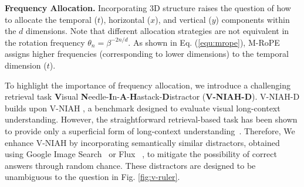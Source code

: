 

\noindent \textbf{Frequency Allocation.}
Incorporating 3D structure raises the question of how to allocate the temporal ($t$), horizontal ($x$), and vertical ($y$) components within the $d$ dimensions.
Note that different allocation strategies are not equivalent in the rotation frequency $\theta_{n} = \beta^{-2n/d}$.
As shown in Eq. (\ref{equ:mrope}), M-RoPE assigns higher frequencies (corresponding to lower dimensions) to the temporal dimension ($t$).

To highlight the importance of frequency allocation, we introduce a challenging retrieval task \textbf{V}isual \textbf{N}eedle-\textbf{I}n-\textbf{A}-\textbf{H}astack-\textbf{D}istractor (\textbf{V-NIAH-D}).
V-NIAH-D builds upon V-NIAH \cite{zhang2024longva}, a benchmark designed to evaluate visual long-context understanding.
However, the straightforward retrieval-based task has been shown to provide only a superficial form of long-context understanding~\cite{hsieh2024ruler,yuan2024lv}.
Therefore, We enhance V-NIAH by incorporating semantically similar distractors, obtained using Google Image Search~\cite{googleimagesearch} or Flux ~\cite{flux2023}, to mitigate the possibility of correct answers through random chance.
These distractors are designed to be unambiguous to the question in Fig. \ref{fig:v-ruler}.



